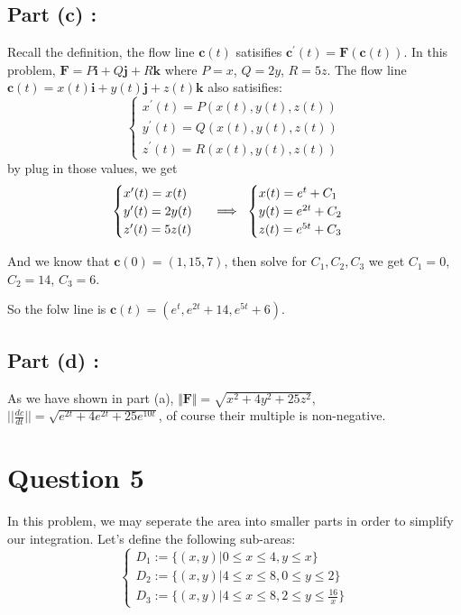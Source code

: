 \documentclass[12pt]{article}
\renewcommand{\vec}[1]{\boldsymbol{#1}}
\begin{document}
\subsection*{Part (c) :}
Recall the definition, the flow line $\vec c(t)$ 
satisifies $\vec c^{\prime}(t) = \vec{F}(\vec c(t))$.
In this problem, $\vec{F} = P\vec i + Q\vec j + R\vec k$
where $P = x$, $Q = 2y$, $R = 5z$. The flow line
$\vec c(t)  = x(t) \vec i + y(t) \vec j + z(t) \vec k$
also satisifies:
\[\begin{cases}
    x^{\prime}(t) = P(x(t),y(t),z(t)) \\
    y^{\prime}(t) = Q(x(t),y(t),z(t)) \\
    z^{\prime}(t) = R(x(t),y(t),z(t)) 
\end{cases}\]
by plug in those values, we get
\[\begin{cases}
    x^{\prime}(t) = x(t) \\
    y^{\prime}(t) = 2y(t) \\
    z^{\prime}(t) = 5z(t)
\end{cases} \hspace*{0.2cm} \Longrightarrow
\hspace*{0.2cm}
\begin{cases}
    x(t) = e^t + C_1 \\
    y(t) = e^{2t} + C_2 \\
    z(t) = e^{5t} + C_3
\end{cases}\]

And we know that $\vec{c}(0) = (1,15,7)$, then solve for
$C_1,C_2,C_3$ we get $C_1 = 0$, $C_2 = 14$, 
$C_3 = 6$. 

So the folw line is $\vec{c}(t) = \left(
    e^t , e^{2t} + 14, e^{5t} + 6
\right)$.


\subsection*{Part (d) :}
As we have shown in part (a), $\Vert \vec F \Vert = 
\sqrt{x^2+4y^2+25z^2}$, $\displaystyle{
    \Bigg| \Bigg| \frac{dc}{dt} \Bigg|\Bigg|
 = \sqrt{e^{2t}+4e^{2t}+25e^{10t}}}$, of course
their multiple is non-negative.



\newpage
\section*{Question 5}

In this problem, we may seperate the area into smaller
parts in order to simplify our integration. 
Let's define the following sub-areas:
\[\begin{cases}
    D_1 := \lbrace (x,y) \Big \vert 0 \leq x \leq 4, y \leq x \rbrace \\
    D_2 := \lbrace (x,y) \Big \vert 4 \leq x \leq 8, 0 \leq y \leq 2 \rbrace \\
    D_3 := \lbrace (x,y) \Big \vert 4 \leq x \leq 8, 2 \leq y \leq \displaystyle{\frac{16}{x} }\rbrace
\end{cases}\]
\end{document}
